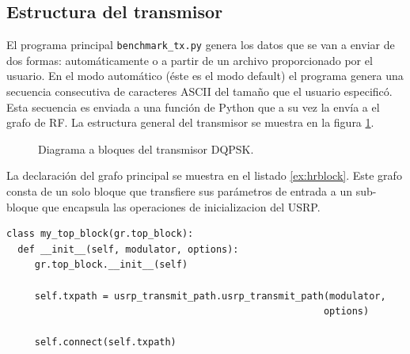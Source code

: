 \subsection{Estructura del transmisor}
El programa principal \verb|benchmark_tx.py| genera los datos que se van a enviar de dos formas:
autom\'aticamente o a partir de un archivo proporcionado por el usuario. En el modo autom\'atico
(\'este es el modo default) el programa genera una secuencia consecutiva de caracteres ASCII del tama\~no
que el usuario especific\'o. Esta secuencia es enviada a una funci\'on de Python que a su vez la
env\'ia a el grafo de RF. La estructura general del transmisor se muestra en la figura
\ref{fig:grqpsk}.

\begin{figure}[htp]
  \centering
  \vspace{0.5in}
\vspace{0.5in}
\caption{Diagrama a bloques del transmisor DQPSK.}
\label{fig:grqpsk}
\end{figure}

La declaraci\'on del grafo principal se muestra en el listado \ref{ex:hrblock}. Este grafo consta de
un solo bloque que transfiere sus par\'ametros de entrada a un sub-bloque que encapsula las
operaciones de inicializacion del USRP.
 
\begin{lstlisting}[float,frame=single,label=ex:hrblock,caption={Declaraci\'on del bloque
jer\'arquico principal.}]
class my_top_block(gr.top_block):
  def __init__(self, modulator, options):
     gr.top_block.__init__(self)

     self.txpath = usrp_transmit_path.usrp_transmit_path(modulator, 
                                                        options)

     self.connect(self.txpath)
\end{lstlisting}

